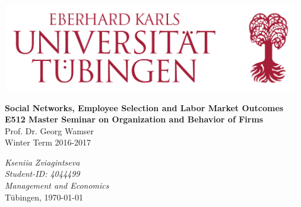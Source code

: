 \documentclass[a4paper,11pt]{article}
\begin{document}




\begin{titlepage}       %

\thispagestyle{empty}   %

\begin{center}
\includegraphics[width=13cm]{Bild.png}
\end{center}

\begin{center}

\vspace*{1.5cm}
{\bf  \Large Social Networks, Employee Selection and Labor Market Outcomes} \\
\vspace*{2cm} 
\textbf{E512 Master Seminar on Organization and Behavior of Firms}
\\
Prof. Dr. Georg Wamser
\\
\vspace*{0.5cm} 
Winter Term 2016-2017\\
\end{center}

\vfill
\begin{flushright}
    \emph{Kseniia Zviagintseva}\\
    \textit{Student-ID: 4044499}\\
     \textit{Management and Economics}\\
 T\"ubingen, \today
  




\end{flushright}



% 
% 
% 

\end{titlepage}

\newpage                %

\listoffigures
\newpage


\tableofcontents

\newpage
{}      %
\setcounter{page}{1}        %
\end{document}
